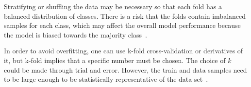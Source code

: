 Stratifying or shuffling the data may be necessary so that each fold has a balanced distribution of classes. There is a risk that the folds contain imbalanced samples for each class, which may affect the overall model performance because the model is biased towards the majority class~\cite{Refaeilzadeh2009}.

In order to avoid overfitting, one can use k-fold cross-validation or derivatives of it, but k-fold implies that a specific number must be chosen. The choice of $k$ could be made through trial and error. However, the train and data samples need to be large enough to be statistically representative of the data set~\cite{Refaeilzadeh2009}.


